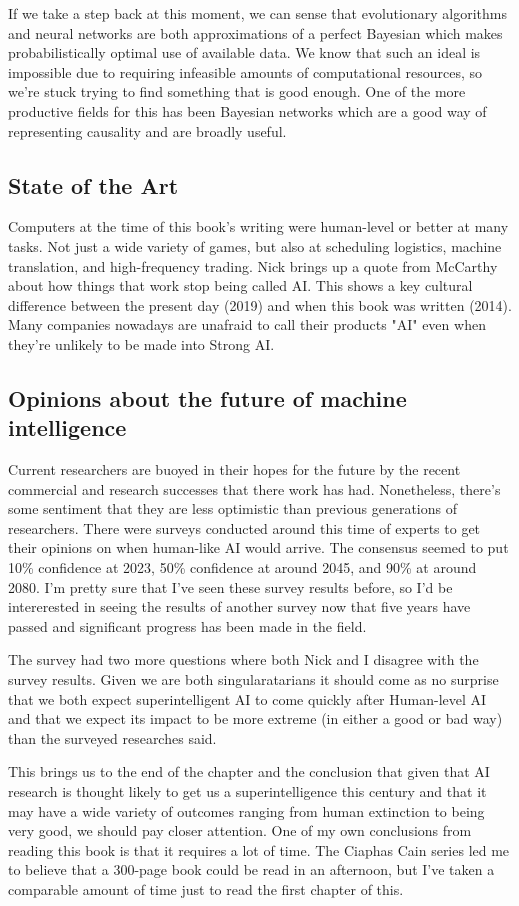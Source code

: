\documentclass{scrartcl}
\begin{document}
If we take a step back at this moment, we can sense that evolutionary algorithms and neural networks are both approximations
of a perfect Bayesian which makes probabilistically optimal use of available data. %
We know that such an ideal is impossible due to requiring infeasible amounts of computational resources, so we're stuck trying
to find something that is good enough.  One of the more productive fields for this has been Bayesian networks which are a
good way of representing causality and are broadly useful. 
\subsection*{State of the Art}
Computers at the time of this book's writing were human-level or better at many tasks. Not just a wide variety of games, but also 
at scheduling logistics, machine translation, and high-frequency trading. Nick brings up a quote from McCarthy about how things
that work stop being called AI. This shows a key cultural difference between the present day (2019) and when this book was
written (2014). Many companies nowadays are unafraid to call their products "AI" even when they're unlikely to be made into
Strong AI.
\subsection*{Opinions about the future of machine intelligence}
Current researchers are buoyed in their hopes for the future by the recent commercial and research successes that there work
has had. Nonetheless, there's some sentiment that they are less optimistic than previous generations of researchers. There
were surveys conducted around this time of experts to get their opinions on when human-like AI would arrive. The consensus
seemed to put 10\% confidence at 2023, 50\% confidence at around 2045, and 90\% at around 2080. I'm pretty sure that I've seen
these survey results before, so I'd be intererested in seeing the results of another survey now that five years have passed and
significant progress has been made in the field.

The survey had two more questions where both Nick and I disagree with the survey results. Given we are both singularatarians it
should come as no surprise that we both expect superintelligent AI to come quickly after Human-level AI and that we expect its
impact to be more extreme (in either a good or bad way) than the surveyed researches said.

This brings us to the end of the chapter and the conclusion that given that AI research is thought likely to get us a superintelligence
this century and that it may have a wide variety of outcomes ranging from human extinction to being very good, we should pay closer
attention. One of my own conclusions from reading this book is that it requires a lot of time. The Ciaphas Cain series led me to believe
that a 300-page book could be read in an afternoon, but I've taken a comparable amount of time just to read the first chapter of this.
\end{document}
